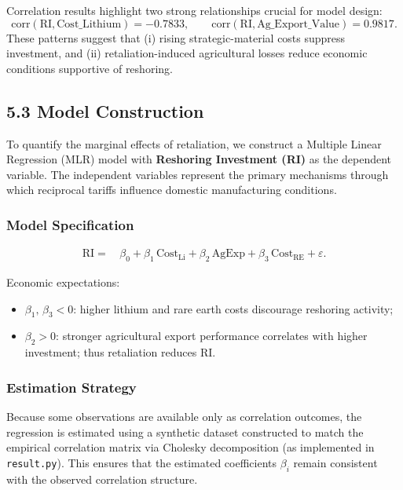 \documentclass{apmcmthesis}
\begin{document}
Correlation results highlight two strong relationships crucial for model design:
\[
\mathrm{corr}(\text{RI}, \text{Cost\_Lithium}) = -0.7833, \qquad
\mathrm{corr}(\text{RI}, \text{Ag\_Export\_Value}) = 0.9817.
\]
These patterns suggest that (i) rising strategic-material costs suppress investment, and (ii) retaliation-induced agricultural losses reduce economic conditions supportive of reshoring.

\subsection*{5.3 Model Construction}

To quantify the marginal effects of retaliation, we construct a Multiple Linear Regression (MLR) model with \textbf{Reshoring Investment (RI)} as the dependent variable. The independent variables represent the primary mechanisms through which reciprocal tariffs influence domestic manufacturing conditions.

\subsubsection*{Model Specification}

\begin{equation}
\label{eq:mlr_model}
\begin{aligned}
\mathrm{RI} 
=\, & \beta_0 
        + \beta_1 \, \mathrm{Cost}_{\mathrm{Li}}
        + \beta_2 \, \mathrm{AgExp}
        + \beta_3 \, \mathrm{Cost}_{\mathrm{RE}}
        + \varepsilon.
\end{aligned}
\end{equation}

Economic expectations:
\begin{itemize}
    \item $\beta_1,\, \beta_3 < 0$: higher lithium and rare earth costs discourage reshoring activity;
    \item $\beta_2 > 0$: stronger agricultural export performance correlates with higher investment; thus retaliation reduces RI.
\end{itemize}

\subsubsection*{Estimation Strategy}

Because some observations are available only as correlation outcomes, the regression is estimated using a synthetic dataset constructed to match the empirical correlation matrix via Cholesky decomposition (as implemented in \texttt{result.py}). This ensures that the estimated coefficients $\beta_i$ remain consistent with the observed correlation structure.
\end{document}
